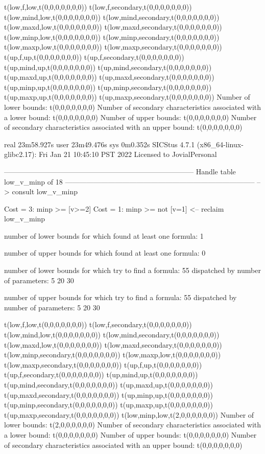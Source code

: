 t(low,f,low,t(0,0,0,0,0,0,0))
t(low,f,secondary,t(0,0,0,0,0,0,0))
t(low,mind,low,t(0,0,0,0,0,0,0))
t(low,mind,secondary,t(0,0,0,0,0,0,0))
t(low,maxd,low,t(0,0,0,0,0,0,0))
t(low,maxd,secondary,t(0,0,0,0,0,0,0))
t(low,minp,low,t(0,0,0,0,0,0,0))
t(low,minp,secondary,t(0,0,0,0,0,0,0))
t(low,maxp,low,t(0,0,0,0,0,0,0))
t(low,maxp,secondary,t(0,0,0,0,0,0,0))
t(up,f,up,t(0,0,0,0,0,0,0))
t(up,f,secondary,t(0,0,0,0,0,0,0))
t(up,mind,up,t(0,0,0,0,0,0,0))
t(up,mind,secondary,t(0,0,0,0,0,0,0))
t(up,maxd,up,t(0,0,0,0,0,0,0))
t(up,maxd,secondary,t(0,0,0,0,0,0,0))
t(up,minp,up,t(0,0,0,0,0,0,0))
t(up,minp,secondary,t(0,0,0,0,0,0,0))
t(up,maxp,up,t(0,0,0,0,0,0,0))
t(up,maxp,secondary,t(0,0,0,0,0,0,0))
Number of lower bounds:                                             t(0,0,0,0,0,0,0)
Number of secondary characteristics associated with a lower bound:  t(0,0,0,0,0,0,0)
Number of upper bounds:                                             t(0,0,0,0,0,0,0)
Number of secondary characteristics associated with an upper bound: t(0,0,0,0,0,0,0)

real	23m58.927s
user	23m49.476s
sys	0m0.352s
SICStus 4.7.1 (x86_64-linux-glibc2.17): Fri Jan 21 10:45:10 PST 2022
Licensed to JovialPersonal


--------------------------------------------------------------------------------
Handle table low_v_minp of 18
--------------------------------------------------------------------------------
--> consult low_v_minp

Cost =  3:  minp >= [v>=2]
Cost =  1:  minp >= not [v=1]
<-- reclaim low_v_minp

number of lower bounds for which found at least one formula: 1

number of upper bounds for which found at least one formula: 0

number of lower bounds for which try to find a formula: 55
dispatched by number of parameters: 5  20  30

number of upper bounds for which try to find a formula: 55
dispatched by number of parameters: 5  20  30

t(low,f,low,t(0,0,0,0,0,0,0))
t(low,f,secondary,t(0,0,0,0,0,0,0))
t(low,mind,low,t(0,0,0,0,0,0,0))
t(low,mind,secondary,t(0,0,0,0,0,0,0))
t(low,maxd,low,t(0,0,0,0,0,0,0))
t(low,maxd,secondary,t(0,0,0,0,0,0,0))
t(low,minp,secondary,t(0,0,0,0,0,0,0))
t(low,maxp,low,t(0,0,0,0,0,0,0))
t(low,maxp,secondary,t(0,0,0,0,0,0,0))
t(up,f,up,t(0,0,0,0,0,0,0))
t(up,f,secondary,t(0,0,0,0,0,0,0))
t(up,mind,up,t(0,0,0,0,0,0,0))
t(up,mind,secondary,t(0,0,0,0,0,0,0))
t(up,maxd,up,t(0,0,0,0,0,0,0))
t(up,maxd,secondary,t(0,0,0,0,0,0,0))
t(up,minp,up,t(0,0,0,0,0,0,0))
t(up,minp,secondary,t(0,0,0,0,0,0,0))
t(up,maxp,up,t(0,0,0,0,0,0,0))
t(up,maxp,secondary,t(0,0,0,0,0,0,0))
t(low,minp,low,t(2,0,0,0,0,0,0))
Number of lower bounds:                                             t(2,0,0,0,0,0,0)
Number of secondary characteristics associated with a lower bound:  t(0,0,0,0,0,0,0)
Number of upper bounds:                                             t(0,0,0,0,0,0,0)
Number of secondary characteristics associated with an upper bound: t(0,0,0,0,0,0,0)

